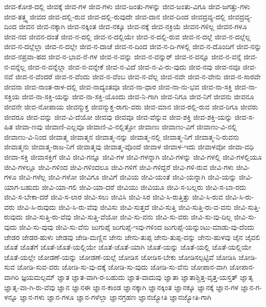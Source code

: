 {ಜೀವ-ಕೋಶ-ದಲ್ಲಿ
ಜೀವಕ್ಕೆ
ಜೀವ-ಗಳ
ಜೀವ-ಗಳು
ಜೀವ-ಜಂತು-ಗಳನ್ನು
ಜೀವ-ಜಂತು-ವಿಗೂ
ಜೀವ-ಜಗತ್ತು-ಗಳು
ಜೀವ-ತತ್ತ್ವ
ಜೀವದ
ಜೀವ-ದಲ್ಲಿ-ರುವ
ಜೀವ-ದಲ್ಲಿ-ರುವುದೇ
ಜೀವ-ದಾನ
ಜೀವ-ದಿಂದ
ಜೀವದ್ರವ್ಯ-ದಲ್ಲಿ
ಜೀವದ್ರವ್ಯ-ದಿಂದ
ಜೀವನ
ಜೀವ-ನಕ್ಕಾಗಿ
ಜೀವ-ನಕ್ಕಿಂತ
ಜೀವ-ನಕ್ಕೂ
ಜೀವ-ನಕ್ಕೆ
ಜೀವ-ನಕ್ರಿಯೆ
ಜೀವನ-ಗಳಿಲ್ಲ
ಜೀವನ-ಗಳೂ
ಜೀವ-ನದ
ಜೀವನ-ದಂತೆ
ಜೀವ-ನ-ದಲ್ಲಿ
ಜೀವ-ನ-ದಲ್ಲಿಯೇ
ಜೀವ-ನ-ದಲ್ಲಿ-ರುವ
ಜೀವ-ನ-ದಲ್ಲೆ
ಜೀವ-ನ-ದಲ್ಲೆಲ್ಲ
ಜೀವ-ನ-ದಲ್ಲೆಲ್ಲಾ
ಜೀವ-ನ-ದಲ್ಲೇ
ಜೀವ-ನ-ದಾಚೆ
ಜೀವ-ನ-ದಿಂದ
ಜೀವ-ನ-ದಿ-ಗಳಲ್ಲಿ
ಜೀವ-ನ-ದೊಂದಿಗೆ
ಜೀವ-ನನ್ನು
ಜೀವ-ನಪ್ರವಾ-ಹದ
ಜೀವ-ನ-ಭಾವ-ನೆ-ಗಳ
ಜೀವ-ನ-ವನ್ನು
ಜೀವ-ನ-ವನ್ನುರ್
ಜೀವ-ನ-ವನ್ನೂ
ಜೀವ-ನ-ವನ್ನೆ
ಜೀವ-ನ-ವನ್ನೆಲ್ಲ
ಜೀವ-ನ-ವನ್ನೆಲ್ಲಾ
ಜೀವ-ನ-ವನ್ನೇಕೆ
ಜೀವ-ನ-ವಿದೆ
ಜೀವ-ನ-ವಿ-ರು-ವುದು
ಜೀವ-ನವು
ಜೀವ-ನವೂ
ಜೀವ-ನವೆ
ಜೀವ-ನ-ವೆಂದರೆ
ಜೀವ-ನ-ವೆಂದು
ಜೀವ-ನ-ವೆಂಬ
ಜೀವ-ನ-ವೆಲ್ಲ
ಜೀವ-ನವೇ
ಜೀವ-ನ-ವೇನು
ಜೀವ-ನ-ಸಾರವೇ
ಜೀವನಾ
ಜೀವ-ನಾಂತ-ರಾಳ-ದಲ್ಲಿ
ಜೀವ-ನಾದ್ಯಂತವೂ
ಜೀವ-ನಾ-ಧಾರ
ಜೀವ-ನಾ-ನು-ಭವ
ಜೀವ-ನಾ-ಸಕ್ತಿ
ಜೀವ-ನಾ-ಸಕ್ತಿಯ
ಜೀವ-ನಾ-ಸಕ್ತಿ-ಯನ್ನು
ಜೀವ-ನಾ-ಸಕ್ತಿ-ಯೊಂದು
ಜೀವ-ನಿ-ಗಾಗಿ
ಜೀವ-ನಿಗೂ
ಜೀವ-ನಿಗೆ
ಜೀವನು
ಜೀವನೂ
ಜೀವನೇ
ಜೀವ-ನೋಪಾಯ
ಜೀವನ್ಮುಕ್ತ
ಜೀವನ್ಮುಕ್ತ-ರಾಗು-ವರು
ಜೀವ-ಮಾನ
ಜೀವ-ರಲ್ಲಿ-ರುವ
ಜೀವ-ರಿಗೂ
ಜೀವರು
ಜೀವರೂ
ಜೀವ-ವನ್ನು
ಜೀವ-ವಿ-ದೆಯೋ
ಜೀವವು
ಜೀವವೂ
ಜೀವ-ವೆನ್ನುವ
ಜೀವ-ಶಕ್ತಿ
ಜೀವ-ಶಕ್ತಿ-ಯನ್ನು
ಜೀವ-ಸ-ಹಿತ
ಜೀವಾ-ಣವು
ಜೀವಾಣಿ-ಎಲ್ಲವೂ
ಜೀವಾಣಿ-ವಿ-ನಲ್ಲಿತ್ತೋ
ಜೀವಾಣು
ಜೀವಾಣು-ವಿಗೆ
ಜೀವಾಣು-ವಿ-ನಲ್ಲಿ
ಜೀವಾಣು-ವಿ-ನಿಂದ
ಜೀವಾತ್ಮ
ಜೀವಾತ್ಮನ
ಜೀವಾತ್ಮ-ನನ್ನು
ಜೀವಾತ್ಮ-ನಲ್ಲಿ
ಜೀವಾತ್ಮ-ನಿಗೆ
ಜೀವಾತ್ಮ-ನಿ-ರುವನು
ಜೀವಾತ್ಮನು
ಜೀವಾತ್ಮ-ರಾಜ-ನಿಗೆ
ಜೀವಾತ್ಮವು
ಜೀವಾತ್ಮ-ವೊಂದೆ
ಜೀವಾಳ
ಜೀವಾಳ-ಇದು
ಜೀವಾಳವೋ
ಜೀವಾ-ವಧಿ
ಜೀವಾ-ಸಕ್ತಿ
ಜೀವಾಸಕ್ತಿಗೆ
ಜೀವಿ
ಜೀವಿ-ಗನ್ನೂ
ಜೀವಿ-ಗಳ
ಜೀವಿ-ಗಳನ್ನಾಗಿ
ಜೀವಿ-ಗಳನ್ನು
ಜೀವಿ-ಗಳಲ್ಲಿ
ಜೀವಿ-ಗಳಲ್ಲಿಯೂ
ಜೀವಿ-ಗಳಲ್ಲೂ
ಜೀವಿ-ಗಳಿಂದ
ಜೀವಿ-ಗಳಿಂದಲೂ
ಜೀವಿ-ಗಳಿಗೆ
ಜೀವಿ-ಗಳಿದ್ದರೆ
ಜೀವಿ-ಗಳಿ-ರುವ
ಜೀವಿ-ಗಳು
ಜೀವಿ-ಗಳೂ
ಜೀವಿ-ಗಳೆಲ್ಲ
ಜೀವಿ-ಗಳೋ
ಜೀವಿಗೂ
ಜೀವಿಗೆ
ಜೀವಿಯ
ಜೀವಿ-ಯಂತೆ
ಜೀವಿ-ಯನ್ನಾಗಿ
ಜೀವಿ-ಯನ್ನು
ಜೀವಿ-ಯಾಗ-ಬಹುದು
ಜೀವಿ-ಯಾ-ಗಲಿ
ಜೀವಿ-ಯಾ-ದರೆ
ಜೀವಿಯು
ಜೀವಿಯೂ
ಜೀವಿ-ಸ-ಬಲ್ಲರು
ಜೀವಿ-ಸ-ಬಾ-ರದು
ಜೀವಿ-ಸ-ಬೇಕಾ-ದರೆ
ಜೀವಿ-ಸ-ಲಾರ
ಜೀವಿ-ಸಲು
ಜೀವಿಸಿ
ಜೀವಿ-ಸಿರ
ಜೀವಿ-ಸಿ-ರುತ್ತಿತ್ತು
ಜೀವಿ-ಸಿ-ರುವ
ಜೀವಿ-ಸಿ-ರು-ವರು
ಜೀವಿ-ಸಿ-ರುವುದು
ಜೀವಿ-ಸಿ-ರು-ವೆವು
ಜೀವಿಸು
ಜೀವಿ-ಸುತ್ತದೆ
ಜೀವಿ-ಸುತ್ತಿ
ಜೀವಿ-ಸುತ್ತಿ-ರು-ವ-ವನು
ಜೀವಿ-ಸುತ್ತಿ-ರುವುದು
ಜೀವಿ-ಸುತ್ತಿ-ರು-ವೆವು
ಜೀವಿ-ಸುತ್ತಿ-ವೆಯೋ
ಜೀವಿ-ಸು-ವನು
ಜೀವಿ-ಸು-ವರು
ಜೀವಿ-ಸು-ವು-ದಿಲ್ಲ
ಜೀವಿ-ಸು-ವುದು
ಜೀವಿ-ಸು-ವುವು
ಜೀವಿ-ಸು-ವೆನು
ಜುಗುಪ್ಸೆ
ಜುಗುಪ್ಸೆ-ಇವು-ಗಳಿಂದ
ಜುಗುಪ್ಸೆ-ಯನ್ನುಂಟು-ಮಾಡು-ವು-ದೆಂದು
ಜೇಡರ
ಜೇಡರ-ಹುಳು
ಜೇಡವು
ಜೇಡಿ-ಮಣ್ಣಿನ
ಜೇನು
ಜೇನು-ತುಪ್ಪ
ಜೇನು-ತುಪ್ಪ-ವನ್ನು
ಜೇನು-ಹುಳವು
ಜೈನ
ಜೈವಲಿ
ಜೊತೆ
ಜೊತೆಗೆ
ಜೊತೆ-ಜೊತೆ-ಯಲ್ಲಿಯೇ
ಜೊತೆ-ಜೊತೆ-ಯಾಗಿ
ಜೊತೆ-ಯನ್ನು
ಜೊತೆ-ಯಲ್ಲಿ
ಜೊತೆ-ಯಲ್ಲಿಯೇ
ಜೊತೆ-ಯಲ್ಲೇ
ಜೋಡಣೆ-ಯನ್ನು
ಜೋಡಣೆ-ಯಲ್ಲೆ
ಜೋಡಿಸ
ಜೋಡಿಸ-ಬೇಕು
ಜೋಡಿಸಲ್ಪಟ್ಟಿವೆ
ಜೋಡಿಸಿ
ಜೋಡಿ-ಸುವ
ಜೋಡಿ-ಸುವ-ವರು
ಜೋಡಿ-ಸು-ವು-ದಕ್ಕೆ
ಜೋಡಿ-ಸು-ವುದು
ಜೋಡಿ-ಸು-ವೆನು
ಜೋಪಾನ-ವಾಗಿ
ಜೋಪಾನ-ವಾಗಿರಿ
ಜ್ಞಯಮಲ್ಪಮ್
ಜ್ಞಾತ
ಜ್ಞಾತ-ವಾಗಿ-ರ-ಬಹುದು
ಜ್ಞಾತ-ವಾದುವು
ಜ್ಞಾತಾ
ಜ್ಞಾತಾಶ್ಚಿತ್ತ-ವೃತ್ತ-ಯಸ್ತತ್
ಜ್ಞಾತೃ
ಜ್ಞಾತೃ-ವಾ-ಗಿ-ರು-ವೆವು
ಜ್ಞಾನ
ಜ್ಞಾನಈ
ಜ್ಞಾನ-ಕಾಂಡ
ಜ್ಞಾನಕ್ಕಾಗಿ
ಜ್ಞಾನಕ್ಕಿಂತ
ಜ್ಞಾನಕ್ಕೂ
ಜ್ಞಾನಕ್ಕೆ
ಜ್ಞಾನ-ಗಳ
ಜ್ಞಾನ-ಗ-ಳನ್ನೂ
ಜ್ಞಾನ-ಗಳು
ಜ್ಞಾನ-ಗಳೂ
ಜ್ಞಾನ-ಗಳೆಲ್ಲಾ
ಜ್ಞಾನಗ್ರಹಣ
ಜ್ಞಾನಜ್ಯೋತಿ
ಜ್ಞಾನಜ್ಯೋತಿ-ಗಾಗಿ
}
